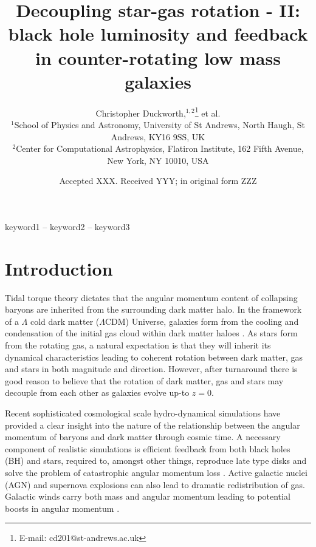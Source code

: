 \documentclass[fleqn,usenatbib]{mnras}
\title[Decoupling star-gas rotation - II]{Decoupling star-gas rotation - II: black hole luminosity and feedback in counter-rotating low mass galaxies}
\author[C. Duckworth et al.]{Christopher Duckworth,$^{1,2}$\thanks{E-mail: cd201@st-andrews.ac.uk}
et al.
\\
$^{1}$School of Physics and Astronomy, University of St Andrews, North Haugh, St Andrews, KY16 9SS, UK\\
$^{2}$Center for Computational Astrophysics, Flatiron Institute, 162 Fifth Avenue, New York, NY 10010, USA\\
}
\date{Accepted XXX. Received YYY; in original form ZZZ}
\begin{document}
\label{firstpage}
\pagerange{\pageref{firstpage}--\pageref{lastpage}}
\maketitle

\begin{abstract}

\end{abstract}

\begin{keywords}
keyword1 -- keyword2 -- keyword3
\end{keywords}



\section{Introduction}
Tidal torque theory \citep[TTT;][]{hoyle1951, peebles1969, Doroshkevich1970} dictates that the angular momentum content of collapsing baryons are inherited from the surrounding dark matter halo. In the framework of a $\Lambda$ cold dark matter ($\Lambda$CDM) Universe, galaxies form from the cooling and condensation of the initial gas cloud within dark matter haloes \citep{fall1980, mo1998}. As stars form from the rotating gas, a natural expectation is that they will inherit its dynamical characteristics leading to coherent rotation between dark matter, gas and stars in both magnitude and direction. However, after turnaround there is good reason to believe that the rotation of dark matter, gas and stars may decouple from each other as galaxies evolve up-to $z=0$. 

Recent sophisticated cosmological scale hydro-dynamical simulations have provided a clear insight into the nature of the relationship between the angular momentum of baryons and dark matter through cosmic time. A necessary component of realistic simulations is efficient feedback from both black holes (BH) and stars, required to, amongst other things, reproduce late type disks and solve the problem of catastrophic angular momentum loss \citep[e.g.][]{zavala2008, scannapieco2009}. Active galactic nuclei (AGN) and supernova explosions can also lead to dramatic redistribution of gas. Galactic winds carry both mass and angular momentum leading to potential boosts in angular momentum \citep[e.g.][]{DeFelippis2017}. 
\end{document}
